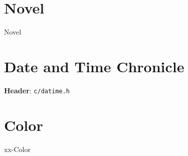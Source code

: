 

\section{Novel}

{Novel}



\section{Date and Time Chronicle}

\textbf{Header}: \verb|c/datime.h|

\section{Color}

{xx-Color}

